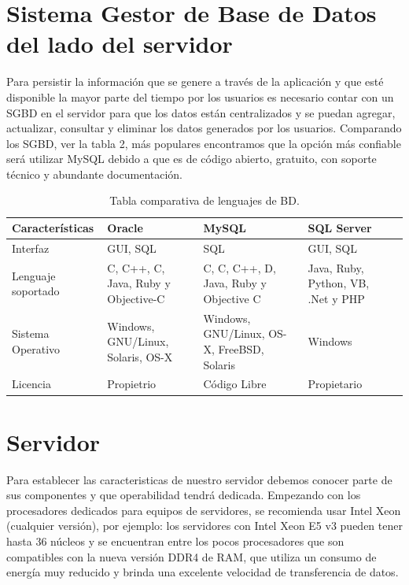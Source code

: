 	
	\section{Sistema Gestor de Base de Datos del lado del servidor}
	\noindent Para persistir la información que se genere a través de la aplicación y que esté disponible la mayor parte del tiempo por los usuarios es necesario contar con un SGBD en el servidor para que los datos están centralizados y se puedan agregar, actualizar, consultar y eliminar los datos generados por los usuarios. Comparando los SGBD, ver la tabla 2, más populares encontramos que la opción más confiable será utilizar MySQL debido a que es de código abierto, gratuito, con soporte técnico y abundante documentación. 
	
	\begin{table}[htbp]
		\begin{center}
			\begin{tabular}{|l|p{35mm}|p{35mm}|p{35mm}|l}
				\hline
				Caracter\'isticas & Oracle & MySQL & SQL Server \\
				\hline 
				Interfaz & GUI, SQL & SQL & GUI, SQL \\ \hline
				Lenguaje soportado & C, C++, C, Java, Ruby y Objective-C & C, C, C++, D, Java, Ruby y Objective C & Java, Ruby, Python, VB, .Net y PHP  \\ \hline
				Sistema Operativo & Windows, GNU/Linux, Solaris, OS-X & Windows, GNU/Linux, OS-X, FreeBSD, Solaris & Windows \\ \hline
				Licencia & Propietrio & Código Libre & Propietario \\ \hline
			\end{tabular}
			\caption{Tabla comparativa de lenguajes de BD.}
			\label{tablaServidor}
		\end{center}
	\end{table}
	
	

	\section{Servidor}
	\noindent Para establecer las caracteristicas de nuestro servidor debemos conocer parte de sus componentes y que operabilidad tendrá dedicada.
	Empezando con los procesadores dedicados para equipos de servidores, se recomienda usar Intel Xeon (cualquier versión), por ejemplo: los servidores con Intel Xeon E5 v3 pueden tener hasta 36 núcleos y se encuentran entre los pocos procesadores que son compatibles con la nueva versión DDR4 de RAM, que utiliza un consumo de energía muy reducido y brinda una excelente velocidad de transferencia de datos.\cite{serv}
	
